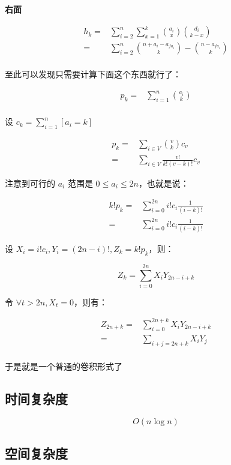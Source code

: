 \documentclass[UTF8]{article}
\begin{document}
\textbf{右面}

$$
\begin{aligned}
h_k
= &\sum_{i=2}^{n}\sum_{x=1}^{k}{a_i \choose x}{d_i \choose k-x} \\
= &\sum_{i=2}^{n}{n+a_i-a_{fa_i} \choose k}-{n-a_{fa_i} \choose k} \\
\end{aligned}
$$

至此可以发现只需要计算下面这个东西就行了：

$$
\begin{aligned}
p_k
=&\sum_{i=1}^{n}{a_i \choose k} \\
\end{aligned}
$$

设 $c_k=\sum_{i=1}^{n}[a_i=k]$

$$
\begin{aligned}
p_k
= &\sum_{i \in V} {v \choose k}c_v \\
= &\sum_{i \in V} \frac{v!}{k!(v-k)!}c_v
\end{aligned}
$$

注意到可行的 $a_i$ 范围是 $0 \le a_i \le 2n$，也就是说：

$$
\begin{aligned}
k!p_k
=&\sum_{i=0}^{2n}i!c_i\frac{1}{(i-k)!} \\
=&\sum_{i=0}^{2n}i!c_i\frac{1}{(i-k)!}
\end{aligned}
$$

设 $X_i=i!c_i,Y_i=(2n-i)!,Z_k=k!p_k$，则：

$$
Z_k=\sum_{i=0}^{2n}X_iY_{2n-i+k}
$$

令 $\forall t > 2n,X_{t}=0$，则有：

$$
\begin{aligned}
Z_{2n+k}
=&\sum_{i=0}^{2n+k}X_iY_{2n-i+k} \\
=&\sum_{i+j=2n+k}X_iY_{j} \\
\end{aligned}
$$

于是就是一个普通的卷积形式了

\subsection{时间复杂度}

$$
O(n \log n)
$$

\subsection{空间复杂度}
\end{document}
